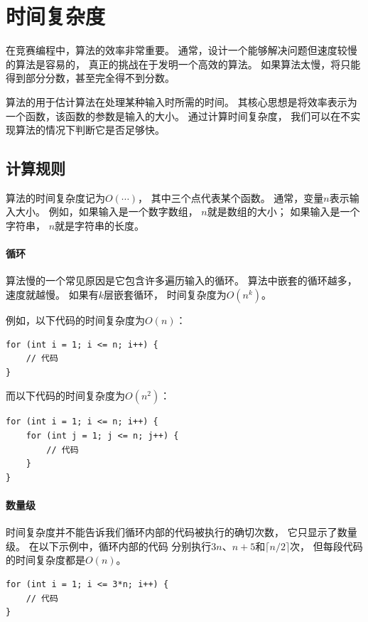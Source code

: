 \chapter{时间复杂度}


在竞赛编程中，算法的效率非常重要。
通常，设计一个能够解决问题但速度较慢的算法是容易的，
真正的挑战在于发明一个高效的算法。
如果算法太慢，将只能得到部分分数，甚至完全得不到分数。

算法的用于估计算法在处理某种输入时所需的时间。
其核心思想是将效率表示为一个函数，该函数的参数是输入的大小。
通过计算时间复杂度，
我们可以在不实现算法的情况下判断它是否足够快。

\section{计算规则}

算法的时间复杂度记为$O(\cdots)$，
其中三个点代表某个函数。
通常，变量$n$表示输入大小。
例如，如果输入是一个数字数组，
$n$就是数组的大小；
如果输入是一个字符串，
$n$就是字符串的长度。

\subsubsection*{循环}

算法慢的一个常见原因是它包含许多遍历输入的循环。
算法中嵌套的循环越多，速度就越慢。
如果有$k$层嵌套循环，
时间复杂度为$O(n^k)$。

例如，以下代码的时间复杂度为$O(n)$：
\begin{lstlisting}
for (int i = 1; i <= n; i++) {
    // 代码
}
\end{lstlisting}

而以下代码的时间复杂度为$O(n^2)$：
\begin{lstlisting}
for (int i = 1; i <= n; i++) {
    for (int j = 1; j <= n; j++) {
        // 代码
    }
}
\end{lstlisting}

\subsubsection*{数量级}

时间复杂度并不能告诉我们循环内部的代码被执行的确切次数，
它只显示了数量级。
在以下示例中，循环内部的代码
分别执行$3n$、$n+5$和$\lceil n/2 \rceil$次，
但每段代码的时间复杂度都是$O(n)$。

\begin{lstlisting}
for (int i = 1; i <= 3*n; i++) {
    // 代码
}
\end{lstlisting}


